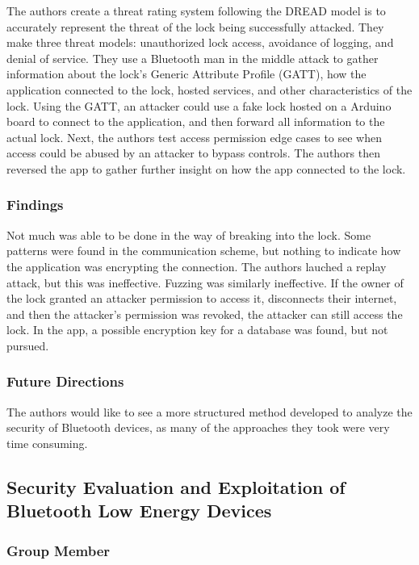 \noindent
The authors create a threat rating system following the DREAD model is to accurately represent the threat of the lock being successfully attacked. They make three threat models: unauthorized lock access, avoidance of logging, and denial of service. They use a Bluetooth man in the middle attack to gather information about the lock’s Generic Attribute Profile (GATT), how the application connected to the lock, hosted services, and other characteristics of the lock. Using the GATT, an attacker could use a fake lock hosted on a Arduino board to connect to the application, and then forward all information to the actual lock. Next, the authors test access permission edge cases to see when access could be abused by an attacker to bypass controls. The authors then reversed the app to gather further insight on how the app connected to the lock.

\subsubsection{Findings}

\noindent
Not much was able to be done in the way of breaking into the lock. Some patterns were found in the communication scheme, but nothing to indicate how the application was encrypting the connection. The authors lauched a replay attack, but this was ineffective. Fuzzing was similarly ineffective. If the owner of the lock granted an attacker permission to access it, disconnects their internet, and then the attacker's permission was revoked, the attacker can still access the lock. In the app, a possible encryption key for a database was found, but not pursued.

\subsubsection{Future Directions}

\noindent
The authors would like to see a more structured method developed to analyze the security of Bluetooth devices, as many of the approaches they took were very time consuming. 

\subsection{Security Evaluation and Exploitation of Bluetooth Low Energy Devices}

\subsubsection{Group Member}

